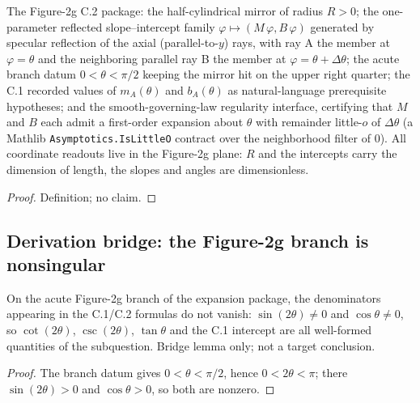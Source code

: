 \begin{definition}
\label{def:IPhO2026Problems_problem_IPhO_2026_2_C_2:NeighboringRayExpansion}
The Figure-2g C.2 package: the half-cylindrical mirror of radius $R > 0$;
the one-parameter reflected slope--intercept family
$\varphi \mapsto (M\,\varphi, B\,\varphi)$ generated by specular reflection
of the axial (parallel-to-$y$) rays, with ray A the member at
$\varphi = \theta$ and the neighboring parallel ray B the member at
$\varphi = \theta + \Delta\theta$; the acute branch datum
$0 < \theta < \pi/2$ keeping the mirror hit on the upper right quarter; the
C.1 recorded values of $m_A(\theta)$ and $b_A(\theta)$ as natural-language
prerequisite hypotheses; and the smooth-governing-law regularity interface,
certifying that $M$ and $B$ each admit a first-order expansion about
$\theta$ with remainder little-$o$ of $\Delta\theta$ (a Mathlib
\texttt{Asymptotics.IsLittleO} contract over the neighborhood filter of
$0$).  All coordinate readouts live in the Figure-2g plane: $R$ and the
intercepts carry the dimension of length, the slopes and angles are
dimensionless.
\end{definition}
\begin{proof}
Definition; no claim.
\end{proof}

\subsection*{Derivation bridge: the Figure-2g branch is nonsingular}

\begin{lemma}
\label{lem:IPhO2026Problems_problem_IPhO_2026_2_C_2:branch_denominators_ne_zero}
On the acute Figure-2g branch of the expansion package, the denominators
appearing in the C.1/C.2 formulas do not vanish:
$\sin (2\theta) \neq 0$ and $\cos \theta \neq 0$, so $\cot(2\theta)$,
$\csc(2\theta)$, $\tan\theta$ and the C.1 intercept are all well-formed
quantities of the subquestion.  Bridge lemma only; not a target conclusion.
\end{lemma}
\begin{proof}
The branch datum gives $0 < \theta < \pi/2$, hence $0 < 2\theta < \pi$;
there $\sin(2\theta) > 0$ and $\cos\theta > 0$, so both are nonzero.
\end{proof}


